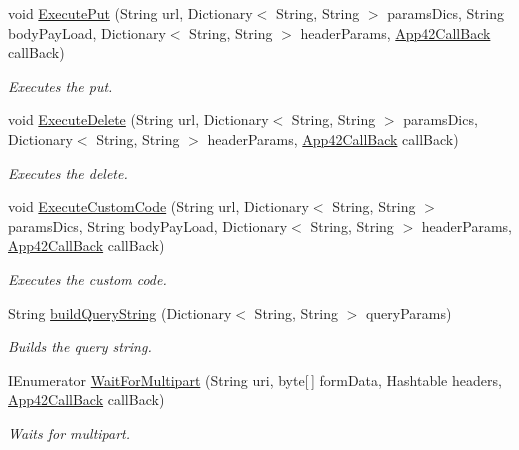 \begin{DoxyCompactItemize}
void \hyperlink{classcom_1_1shephertz_1_1app42_1_1paas_1_1sdk_1_1csharp_1_1connection_1_1_r_e_s_t_connector_w_w_w_ab4d251bec526382f8579d289e06cd61b}{Execute\+Put} (String url, Dictionary$<$ String, String $>$ params\+Dics, String body\+Pay\+Load, Dictionary$<$ String, String $>$ header\+Params, \hyperlink{interfacecom_1_1shephertz_1_1app42_1_1paas_1_1sdk_1_1csharp_1_1_app42_call_back}{App42\+Call\+Back} call\+Back)
\begin{DoxyCompactList}\small\item\em Executes the put. \end{DoxyCompactList}\item 
void \hyperlink{classcom_1_1shephertz_1_1app42_1_1paas_1_1sdk_1_1csharp_1_1connection_1_1_r_e_s_t_connector_w_w_w_a57c6fb13736c79338bccdae4e8f9c9db}{Execute\+Delete} (String url, Dictionary$<$ String, String $>$ params\+Dics, Dictionary$<$ String, String $>$ header\+Params, \hyperlink{interfacecom_1_1shephertz_1_1app42_1_1paas_1_1sdk_1_1csharp_1_1_app42_call_back}{App42\+Call\+Back} call\+Back)
\begin{DoxyCompactList}\small\item\em Executes the delete. \end{DoxyCompactList}\item 
void \hyperlink{classcom_1_1shephertz_1_1app42_1_1paas_1_1sdk_1_1csharp_1_1connection_1_1_r_e_s_t_connector_w_w_w_a4cfd472e20c0dc2461cb37d71cb0edc0}{Execute\+Custom\+Code} (String url, Dictionary$<$ String, String $>$ params\+Dics, String body\+Pay\+Load, Dictionary$<$ String, String $>$ header\+Params, \hyperlink{interfacecom_1_1shephertz_1_1app42_1_1paas_1_1sdk_1_1csharp_1_1_app42_call_back}{App42\+Call\+Back} call\+Back)
\begin{DoxyCompactList}\small\item\em Executes the custom code. \end{DoxyCompactList}\item 
String \hyperlink{classcom_1_1shephertz_1_1app42_1_1paas_1_1sdk_1_1csharp_1_1connection_1_1_r_e_s_t_connector_w_w_w_a57d8c4192580252b5d5c1e625be282a2}{build\+Query\+String} (Dictionary$<$ String, String $>$ query\+Params)
\begin{DoxyCompactList}\small\item\em Builds the query string. \end{DoxyCompactList}\item 
I\+Enumerator \hyperlink{classcom_1_1shephertz_1_1app42_1_1paas_1_1sdk_1_1csharp_1_1connection_1_1_r_e_s_t_connector_w_w_w_a7f0c17a15c384c256fdd661b034c4548}{Wait\+For\+Multipart} (String uri, byte\mbox{[}$\,$\mbox{]} form\+Data, Hashtable headers, \hyperlink{interfacecom_1_1shephertz_1_1app42_1_1paas_1_1sdk_1_1csharp_1_1_app42_call_back}{App42\+Call\+Back} call\+Back)
\begin{DoxyCompactList}\small\item\em Waits for multipart. \end{DoxyCompactList}\end{DoxyCompactItemize}
